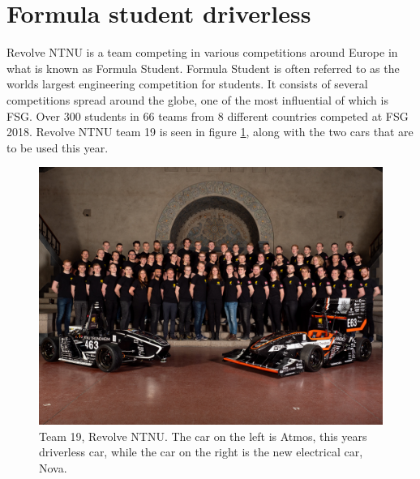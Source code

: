 \section{Formula student driverless}

Revolve NTNU is a team competing in various competitions around Europe in what is known as Formula Student. Formula Student is often referred to as the worlds largest engineering competition for students. It consists of several competitions spread around the globe, one of the most influential of which is \gls{FSG}. Over 300 students in 66 teams from 8 different countries competed at \gls{FSG} 2018. Revolve NTNU team 19 is seen in figure \ref{Fig:Team19}, along with the two cars that are to be used this year.

\begin{figure}
    \centering
    \includegraphics[width=\linewidth]{0_Images/2_Introduction/team19.jpg}
    \caption[Team 19, Revolve NTNU]{Team 19, Revolve NTNU. The car on the left is Atmos, this years driverless car, while the car on the right is the new electrical car, Nova.}
    \label{Fig:Team19}
\end{figure}

